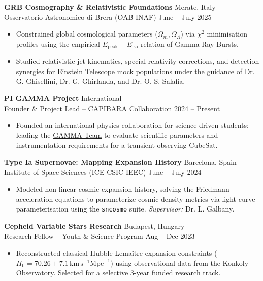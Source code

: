 \documentclass[10pt,a4paper]{article}
\begin{document}
\textbf{GRB Cosmography \& Relativistic Foundations} \hfill Merate, Italy \\
Osservatorio Astronomico di Brera (OAB-INAF) \hfill June -- July 2025
\begin{itemize}
    \itemsep0em  
    \item Constrained global cosmological parameters ($\Omega_m, \Omega_\Lambda$) via $\chi^2$ minimisation profiles using the empirical $E_{\text{peak}}-E_{\text{iso}}$ relation of Gamma-Ray Bursts.
    \item Studied relativistic jet kinematics, special relativity corrections, and detection synergies for Einstein Telescope mock populations under the guidance of Dr. G. Ghisellini, Dr. G. Ghirlanda, and Dr. O. S. Salafia.
\end{itemize}

\textbf{PI GAMMA Project} \hfill International \\
Founder \& Project Lead -- CAPIBARA Collaboration \hfill 2024 -- Present
\begin{itemize}
    \itemsep0em  
    \item Founded an international physics collaboration for science-driven students; leading the \href{https://capibara3.github.io/gamma/}{GAMMA Team} to evaluate scientific parameters and instrumentation requirements for a transient-observing CubeSat.
\end{itemize}

\textbf{Type Ia Supernovae: Mapping Expansion History} \hfill Barcelona, Spain \\
Institute of Space Sciences (ICE-CSIC-IEEC) \hfill June -- July 2024
\begin{itemize}
    \itemsep0em  
    \item Modeled non-linear cosmic expansion history, solving the Friedmann acceleration equations to parameterize cosmic density metrics via light-curve parameterisation using the \texttt{sncosmo} suite. \textit{Supervisor:} Dr. L. Galbany.
\end{itemize}

\textbf{Cepheid Variable Stars Research} \hfill Budapest, Hungary \\
Research Fellow -- Youth \& Science Program \hfill Aug -- Dec 2023
\begin{itemize}
    \itemsep0em  
    \item Reconstructed classical Hubble-Lemaître expansion constraints ($H_0 = 70.26 \pm 7.1 \, \text{km} \, \text{s}^{-1} \text{Mpc}^{-1}$) using observational data from the Konkoly Observatory. Selected for a selective 3-year funded research track.
\end{itemize}
\end{document}
